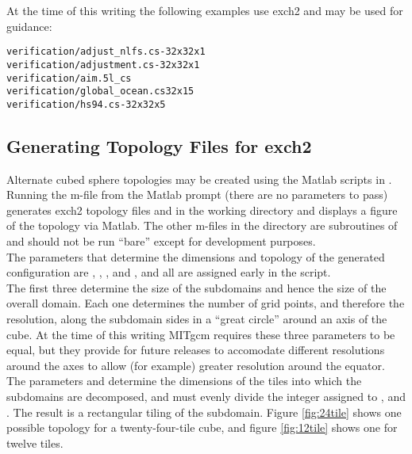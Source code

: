 At the time of this writing the following examples use exch2 and may
be used for guidance:

\begin{verbatim}
verification/adjust_nlfs.cs-32x32x1
verification/adjustment.cs-32x32x1 
verification/aim.5l_cs
verification/global_ocean.cs32x15
verification/hs94.cs-32x32x5
\end{verbatim}




\subsection{Generating Topology Files for exch2}
\label{sec:topogen}

Alternate cubed sphere topologies may be created using the Matlab
scripts in . Running the
m-file
from the Matlab prompt (there are no parameters to pass) generates
exch2 topology files  and
 in the working directory and displays a figure of
the topology via Matlab.  The other m-files in the directory are
subroutines of  and should not be run ``bare'' except
for development purposes. \\

The parameters that determine the dimensions and topology of the
generated configuration are , , ,
 and , and all are assigned early in the script. \\

The first three determine the size of the subdomains and
hence the size of the overall domain.  Each one determines the number
of grid points, and therefore the resolution, along the subdomain
sides in a ``great circle'' around an axis of the cube.  At the time
of this writing MITgcm requires these three parameters to be equal,
but they provide for future releases  to accomodate different
resolutions around the axes to allow (for example) greater resolution
around the equator.\\

The parameters  and  determine the dimensions of
the tiles into which the subdomains are decomposed, and must evenly
divide the integer assigned to ,  and .
The result is a rectangular tiling of the subdomain.  Figure
\ref{fig:24tile} shows one possible topology for a twenty-four-tile
cube, and figure \ref{fig:12tile} shows one for twelve tiles. \\

